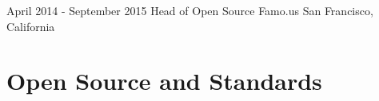 \documentclass[10pt,a4paper,sans]{moderncv}   %
\begin{document}
\cventry
 {April 2014 - September 2015}
 {Head of Open Source}
 {Famo.us}
 {San Francisco, California}{}
 {}


%


\section{Open Source and Standards}
\end{document}
